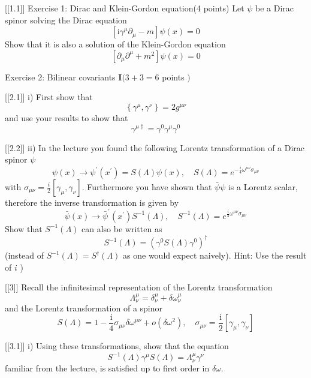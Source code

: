 


[[1.1]]
Exercise 1: Dirac and Klein-Gordon equation(4 points)
Let $\psi$ be a Dirac spinor solving the Dirac equation
$$
\left[\mathrm{i} \gamma^\mu \partial_\mu-m\right] \psi(x)=0
$$
Show that it is also a solution of the Klein-Gordon equation
$$
\left[\partial_\mu \partial^\mu+m^2\right] \psi(x)=0
$$



Exercise 2: Bilinear covariants $\mathbf{I}(3+3=6$ points $)$

[[2.1]]
i) First show that
$$
\left\{\gamma^\mu, \gamma^\nu\right\}=2 g^{\mu \nu}
$$
and use your results to show that
$$
\gamma^{\mu \dagger}=\gamma^0 \gamma^\mu \gamma^0
$$

[[2.2]]
ii) In the lecture you found the following Lorentz transformation of a Dirac spinor $\psi$
$$
\psi(x) \rightarrow \psi^{\prime}\left(x^{\prime}\right)=S(\Lambda) \psi(x), \quad S(\Lambda)=e^{-\frac{i}{4} \omega^{\mu \nu} \sigma_{\mu \nu}}
$$
with $\sigma_{\mu \nu}=\frac{i}{2}\left[\gamma_\mu, \gamma_\nu\right]$.
Furthermore you have shown that $\bar{\psi} \psi$ is a Lorentz scalar, therefore the inverse transformation is given by
$$
\bar{\psi}(x) \rightarrow \bar{\psi}^{\prime}\left(x^{\prime}\right) S^{-1}(\Lambda), \quad S^{-1}(\Lambda)=e^{\frac{i}{4} \omega^{\mu \nu} \sigma_{\mu \nu}}
$$
Show that $S^{-1}(\Lambda)$ can also be written as
$$
S^{-1}(\Lambda)=\left(\gamma^0 S(\Lambda) \gamma^0\right)^{\dagger}
$$
(instead of $S^{-1}(\Lambda)=S^{\dagger}(\Lambda)$ as one would expect naively).
Hint: Use the result of $i$ )



[[3]]
Recall the infinitesimal representation of the Lorentz transformation
$$
\Lambda_\nu^\mu=\delta_\nu^\mu+\delta \omega_\nu^\mu
$$
and the Lorentz transformation of a spinor
$$
S(\Lambda)=1-\frac{\mathrm{i}}{4} \sigma_{\mu \nu} \delta \omega^{\mu \nu}+o\left(\delta \omega^2\right), \quad \sigma_{\mu \nu}=\frac{\mathrm{i}}{2}\left[\gamma_\mu, \gamma_\nu\right]
$$

[[3.1]]
i) Using these transformations, show that the equation
$$
S^{-1}(\Lambda) \gamma^\mu S(\Lambda)=\Lambda_\nu^\mu \gamma^\nu
$$
familiar from the lecture, is satisfied up to first order in $\delta \omega$.

